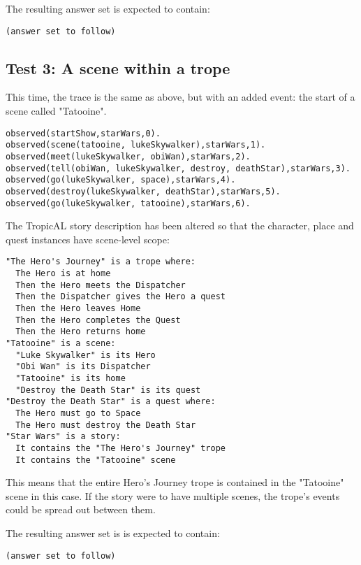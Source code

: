 \documentclass[11pt]{article}
\begin{document}
The resulting answer set is expected to contain:

\begin{verbatim}
(answer set to follow)
\end{verbatim}

\subsection{Test 3: A scene within a trope}
\label{sec:orgheadline4}

This time, the trace is the same as above, but with an added event: the start of a scene called "Tatooine".

\begin{verbatim}
observed(startShow,starWars,0).
observed(scene(tatooine, lukeSkywalker),starWars,1).
observed(meet(lukeSkywalker, obiWan),starWars,2).
observed(tell(obiWan, lukeSkywalker, destroy, deathStar),starWars,3).
observed(go(lukeSkywalker, space),starWars,4).
observed(destroy(lukeSkywalker, deathStar),starWars,5).
observed(go(lukeSkywalker, tatooine),starWars,6).
\end{verbatim}

The TropicAL story description has been altered so that the character, place and quest instances have scene-level scope:

\begin{verbatim}
"The Hero's Journey" is a trope where:
  The Hero is at home
  Then the Hero meets the Dispatcher
  Then the Dispatcher gives the Hero a quest
  Then the Hero leaves Home
  Then the Hero completes the Quest
  Then the Hero returns home
"Tatooine" is a scene:
  "Luke Skywalker" is its Hero
  "Obi Wan" is its Dispatcher
  "Tatooine" is its home
  "Destroy the Death Star" is its quest
"Destroy the Death Star" is a quest where:
  The Hero must go to Space
  The Hero must destroy the Death Star
"Star Wars" is a story:
  It contains the "The Hero's Journey" trope
  It contains the "Tatooine" scene
\end{verbatim}

This means that the entire Hero's Journey trope is contained in the "Tatooine" scene in this case. If the story were to have multiple scenes, the trope's events could be spread out between them.

The resulting answer set is is expected to contain:

\begin{verbatim}
(answer set to follow)
\end{verbatim}
\end{document}
